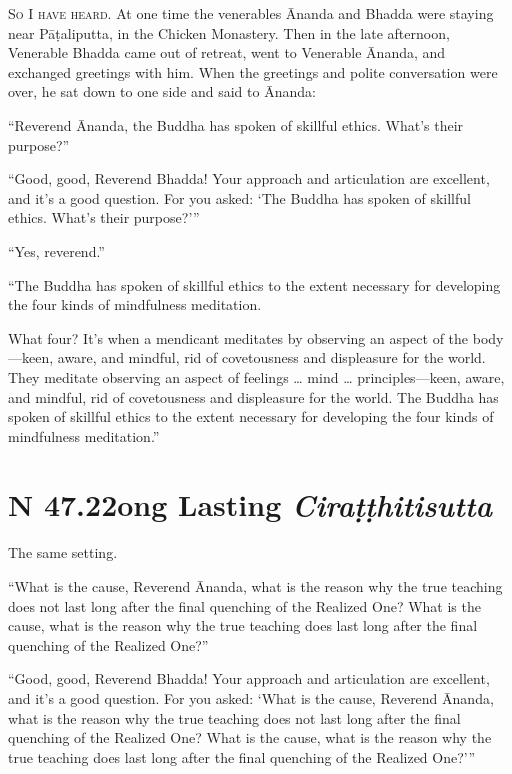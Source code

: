 \documentclass[12pt,openany]{book}%
\newcommand*{\suttatitleacronym}[1]{\smaller[2]{#1}\vspace*{.3em}}
\newcommand*{\suttatitletranslation}[1]{\linebreak{#1}}
\newcommand*{\suttatitleroot}[1]{\linebreak\smaller[2]\itshape{#1}}
\newcommand*{\tocacronym}[1]{\hspace*{-3.3em}{#1}\quad}
\newcommand*{\toctranslation}[1]{#1}
\newcommand*{\tocroot}[1]{(\textit{#1})}
\newcommand*{\scevam}[1]{\textsc{#1}}
\begin{document}
\scevam{So I have heard. }At one time the venerables Ānanda and Bhadda were staying near \textsanskrit{Pāṭaliputta}, in the Chicken Monastery. Then in the late afternoon, Venerable Bhadda came out of retreat, went to Venerable Ānanda, and exchanged greetings with him. When the greetings and polite conversation were over, he sat down to one side and said to Ānanda: 

“Reverend Ānanda, the Buddha has spoken of skillful ethics. What’s their purpose?” 

“Good, good, Reverend Bhadda! Your approach and articulation are excellent, and it’s a good question. For you asked: ‘The Buddha has spoken of skillful ethics. What’s their purpose?’” 

“Yes, reverend.” 

“The Buddha has spoken of skillful ethics to the extent necessary for developing the four kinds of mindfulness meditation. 

What four? It’s when a mendicant meditates by observing an aspect of the body—keen, aware, and mindful, rid of covetousness and displeasure for the world. They meditate observing an aspect of feelings … mind … principles—keen, aware, and mindful, rid of covetousness and displeasure for the world. The Buddha has spoken of skillful ethics to the extent necessary for developing the four kinds of mindfulness meditation.” 

%
\section*{{\suttatitleacronym SN 47.22}{\suttatitletranslation Long Lasting }{\suttatitleroot Ciraṭṭhitisutta}}
\addcontentsline{toc}{section}{\tocacronym{SN 47.22} \toctranslation{Long Lasting } \tocroot{Ciraṭṭhitisutta}}

The same setting. 

“What is the cause, Reverend Ānanda, what is the reason why the true teaching does not last long after the final quenching of the Realized One? What is the cause, what is the reason why the true teaching does last long after the final quenching of the Realized One?” 

“Good, good, Reverend Bhadda! Your approach and articulation are excellent, and it’s a good question. For you asked: ‘What is the cause, Reverend Ānanda, what is the reason why the true teaching does not last long after the final quenching of the Realized One? What is the cause, what is the reason why the true teaching does last long after the final quenching of the Realized One?’” 
\end{document}
